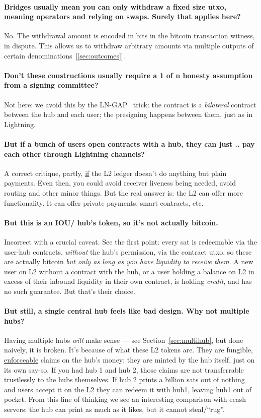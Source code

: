 \documentclass[11pt]{article}
\begin{document}
\paragraph{Bridges usually mean you can only withdraw a fixed size utxo, meaning operators and relying on swaps. Surely that applies here?} No. The withdrawal amount is encoded in bits in the bitcoin transaction witness, in dispute. This allows us to withdraw arbitrary amounts via multiple outputs of certain denominations~[\ref{sec:outcomes}].

\paragraph{Don't these constructions usually require a 1 of n honesty assumption from a signing committee?} Not here: we avoid this by the LN-GAP~\cite{lngap} trick: the contract is a \emph{bilateral} contract between the hub and each user; the presigning happens between them, just as in Lightning.

\paragraph{But if a bunch of users open contracts with a hub, they can just .. pay each other through Lightning channels?} A correct critique, partly, \underline{if} the L2 ledger doesn't do anything but plain payments. Even then, you could avoid receiver liveness being needed, avoid routing and other minor things. But the real answer is: the L2 can offer more functionality. It can offer private payments, smart contracts, etc.

\paragraph{But this is an IOU/ hub's token, so it's not actually bitcoin.} Incorrect with a crucial caveat. See the first point: every sat is redeemable via the user-hub contracts, \emph{without} the hub's permission, via the contract utxo, so these are actually bitcoin \emph{but only as long as you have liquidity to receive them}. A new user on L2 without a contract with the hub, or a user holding a balance on L2 in excess of their inbound liquidity in their own contract, is holding \emph{credit}, and has no such guarantee. But that's their choice.

\paragraph{But still, a single central hub feels like bad design. Why not multiple hubs?} Having multiple hubs \emph{will} make sense --- see Section~\ref{sec:multihub}, but done naively, it is broken. It's because of what these L2 tokens are. They are fungible, \underline{enforceable} claims on the hub's money; they are minted by the hub itself, just on its own say-so. If you had hub 1 and hub 2, those claims are not transferrable trustlessly to the hubs themselves. If hub 2 prints a billion sats out of nothing and users accept it on the L2 they can redeem it with hub1, leaving hub1 out of pocket. From this line of thinking we see an interesting comparison with ecash servers: the hub can print as much as it likes, but it cannot steal/``rug''.
\end{document}

